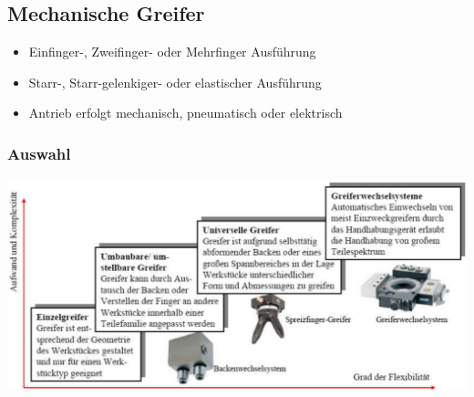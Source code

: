 \begin{minipage}{0.5\linewidth}
    \subsection{Mechanische Greifer}
    \begin{minipage}[t]{0.6\linewidth}
        \begin{itemize}
            \item Einfinger-, Zweifinger- oder Mehrfinger Ausführung
            \item Starr-, Starr-gelenkiger- oder elastischer Ausführung
            \item Antrieb erfolgt mechanisch, pneumatisch oder elektrisch
        \end{itemize}
    \end{minipage}
    \begin{minipage}[t]{0.39\linewidth}
    \end{minipage}
\end{minipage}
\begin{minipage}{0.7\linewidth}
    \subsubsection{Auswahl}
     \includegraphics[width=\linewidth]{./bilder/GreiferAuswahl}
\end{minipage}

